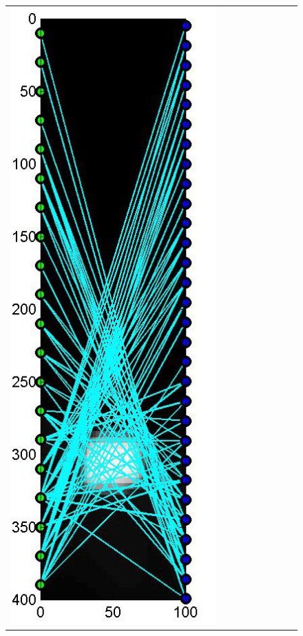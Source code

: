 \documentclass[11pt]{article}
\begin{document}
{\begin{figure}[!h]
\begin{center}
\begin{tabular}{|c|c|c|c|c|c|c|c|c|}
			\includegraphics[width=.9\iwidth]{figures/newFigs/noisy/resultsExp-7-designs}
			&

\end{tabular}
\end{center}
\end{figure}}
\end{document}
